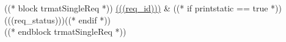 ((* block trmatSingleReq *))
\hyperlink{(((req_id)))}{(((req_id)))} \label{trmat:(((req_id)))} & %
((* if printstatic == true *))(((req_status)))((* endif *)) %
 \\
((* endblock trmatSingleReq *))

